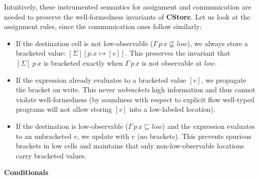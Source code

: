 \documentclass[12pt,a4paper,twoside]{book}
\begin{document}
Intuitively, these instrumented semantics for assignment and communication are needed to preserve the well-formedness invariants of \textbf{CStore}.
Let us look at the assignment rules, since the communication ones follow similarly:
\begin{itemize}
\item If the destination cell is not low-observable (\(\Gamma\,p\,x \not\sqsubseteq low\)), we always store a bracketed value: \([\Sigma][p.x \mapsto [v]]\). This preserves the invariant that \([\Sigma]~p~x\) is bracketed exactly when \(\Gamma\,p\,x\) is not observable at \(low\).
\item If the expression already evaluates to a bracketed value \([v]\), we propagate the bracket on write. This never \emph{unbrackets} high information and thus cannot violate well-formedness (by soundness with respect to explicit flow well-typed programs will not allow storing \([v]\) into a low-labeled location).
\item If the destination is low-observable (\(\Gamma\,p\,x \sqsubseteq low\)) and the expression evaluates to an unbracketed \(v\), we update with \(v\) (no brackets). This prevents spurious brackets in low cells and maintains that only non-low-observable locations carry bracketed values.
\end{itemize}

\noindent\textbf{Conditionals}
\begin{mathpar}



\end{mathpar}
\end{document}
